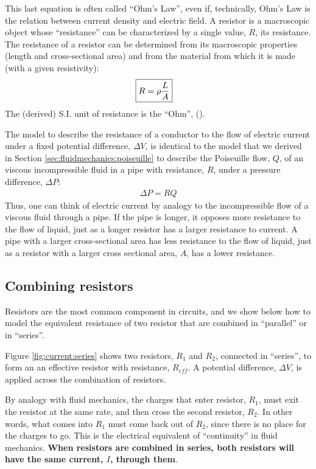 This last equation is often called ``Ohm's Law'', even if, technically, Ohm's Law is the relation between current density and electric field. A resistor is a macroscopic object whose ``resistance'' can be characterized by a single value, $R$, its resistance. The resistance of a resistor can be determined from its macroscopic properties (length and cross-sectional area) and from the material from which it is made (with a given resistivity):
\begin{align*}
\Aboxed{R = \rho \frac{L}{A} }
\end{align*}
The (derived) S.I. unit of resistance is the ``Ohm'', (\si{\Omega}).

The model to describe the resistance of a conductor to the flow of electric current under a fixed potential difference, $\Delta V$, is identical to the model that we derived in Section \ref{sec:fluidmechanics:poiseuille} to describe the Poiseuille flow, $Q$, of an viscous incompressible fluid in a pipe with resistance, $R$, under a pressure difference, $\Delta P$:
\begin{align*}
\Delta P = RQ
\end{align*} 
Thus, one can think of electric current by analogy to the incompressible flow of a viscous fluid through a pipe. If the pipe is longer, it opposes more resistance to the flow of liquid, just as a longer resistor has a larger resistance to current. A pipe with a larger cross-sectional area has less resistance to the flow of liquid, just as a resistor with a larger cross sectional area, $A$, has a lower resistance.
\subsection{Combining resistors}
Resistors are the most common component in circuits, and we show below how to model the equivalent resistance of two resistor that are combined in ``parallel'' or in ``series''.

Figure \ref{fig:current:series} shows two resistors, $R_1$ and $R_2$, connected in ``series'', to form an an effective resistor with resistance, $R_{eff}$. A potential difference, $\Delta V$, is applied across the combination of resistors.

By analogy with fluid mechanics, the charges that enter resistor, $R_1$, must exit the resistor at the same rate, and then cross the second resistor, $R_2$. In other words, what comes into $R_1$ must come back out of $R_2$, since there is no place for the charges to go. This is the electrical equivalent of ``continuity'' in fluid mechanics. \textbf{When resistors are combined in series, both resistors will have the same current, $I$, through them}.

